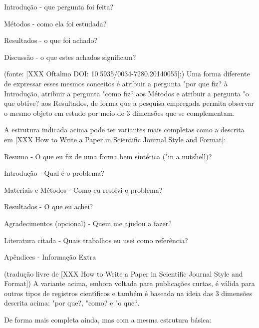 \documentclass[
12pt,		%
openright,	%
twoside,  %
a4paper,			%
chapter=TITLE,		%
english,			%
french,				%
spanish,			%
brazil				%
]{USPSC-classe/USPSC}
\begin{document}
\begin{alineas}
\item Introdu\c{c}\~ao - que pergunta foi feita?
\item M\'etodos - como ela foi estudada?
\item Resultados - o que foi achado?
\item Discuss\~ao - o que estes achados significam? 
\end{alineas}

(fonte: [XXX Oftalmo DOI: 10.5935/0034-7280.20140055]:)
Uma forma diferente de expressar esses mesmos conceitos \'e atribuir a pergunta "por que fiz? \`a Introdu\c{c}\~ao, atribuir a pergunta "como fiz? aos M\'etodos e atribuir a pergunta "o que obtive? aos Resultados, de forma que a pesquisa empregada permita observar o mesmo objeto em estudo por meio de 3 dimens\~oes que se complementam. 




A estrutura indicada acima pode ter variantes mais completas como a descrita em [XXX How to Write a Paper in Scientific Journal Style and Format]:





\begin{alineas}
\item Resumo - O que eu fiz de uma forma bem sint\'etica ("in a nutshell)?
\item Introdu\c{c}\~ao - Qual \'e o problema?
\item Materiais e M\'etodos - Como eu resolvi o problema?
\item Resultados - O que eu achei?
\item Agradecimentos (opcional) - Quem me ajudou a fazer?
\item Literatura citada - Quais trabalhos eu usei como refer\^encia?
\item Ap\^endices - Informa\c{c}\~ao Extra
\end{alineas}

(tradu\c{c}\~ao livre de [XXX How to Write a Paper in Scientific Journal Style and Format])
A variante acima, embora voltada para publica\c{c}\~oes curtas, \'e v\'alida para outros tipos de registros cient\'{\i}ficos e tamb\'em \'e baseada na ideia das 3 dimens\~oes descrita acima: "por que?, "como? e "o que?. 




De forma mais completa ainda, mas com a mesma estrutura b\'asica: 
\end{document}
